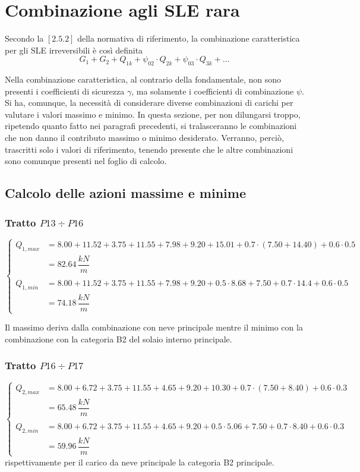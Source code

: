 \section{Combinazione agli SLE rara}
Secondo la $[2.5.2]$ della normativa di riferimento, la combinazione caratteristica per gli SLE irreversibili è così definita
\[
	G_1 + G_2 + Q_{1k} + \psi_{02}\cdot Q_{2k} + \psi_{03}\cdot Q_{3k} + \dots
\]

Nella combinazione caratteristica, al contrario della fondamentale, non sono presenti i coefficienti di sicurezza $\gamma$, ma solamente i coefficienti di combinazione $\psi$. Si ha, comunque, la necessità di considerare diverse combinazioni di carichi per valutare i valori massimo e minimo. In questa sezione, per non dilungarsi troppo, ripetendo quanto fatto nei paragrafi precedenti, si tralasceranno le combinazioni che non danno il contributo massimo o minimo desiderato. Verranno, perciò, trascritti solo i valori di riferimento, tenendo presente che le altre combinazioni sono comunque presenti nel foglio di calcolo.

\subsection{Calcolo delle azioni massime e minime}
\subsubsection*{Tratto $P13\div P16$}
\begin{equation*}
	\begin{cases}
		Q_{1,max} &= 8.00+11.52+3.75 + 11.55+7.98+9.20 + 15.01 + 0.7\cdot(7.50+14.40) + 0.6\cdot0.5\\
		&= 82.64\,\dfrac{kN}{m}\\\\
		Q_{1,min} &= 8.00+11.52+3.75 + 11.55+7.98+9.20 + 0.5\cdot8.68 +7.50 + 0.7\cdot14.4 + 0.6\cdot0.5\\
		&= 74.18\,\dfrac{kN}{m}
	\end{cases}
\end{equation*}

Il massimo deriva dalla combinazione con neve principale mentre il minimo con la combinazione con la categoria B2 del solaio interno principale.

\subsubsection*{Tratto $P16\div P17$}
\begin{equation*}
	\begin{cases}
		Q_{2,max} &= 8.00+6.72+3.75 + 11.55+4.65+9.20 + 10.30 + 0.7\cdot(7.50+8.40) + 0.6\cdot0.3\\
		&= 65.48\,\dfrac{kN}{m}\\\\
		Q_{2,min} &= 8.00+6.72+3.75 + 11.55+4.65+9.20 + 0.5\cdot 5.06 + 7.50 + 0.7\cdot 8.40 + 0.6\cdot0.3\\
		&= 59.96\,\dfrac{kN}{m}
	\end{cases}
\end{equation*}
rispettivamente per il carico da neve principale la categoria B2 principale.

